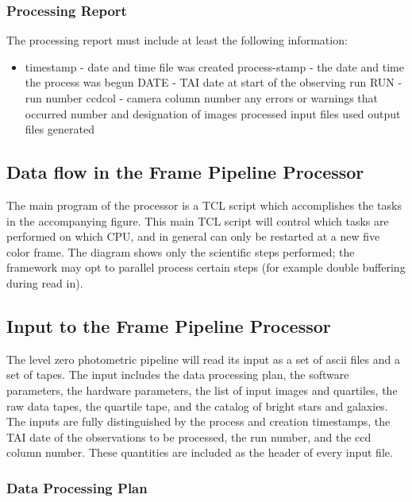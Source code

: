 \subsubsection{Processing Report}

The processing report must include at least the following information:
\begin{itemize}
\item timestamp - date and time file was created
\sitem process-stamp - the date and time the process was begun
\sitem DATE - TAI date at start of the observing run
\sitem RUN - run number
\sitem ccdcol - camera column number
\sitem any errors or warnings that occurred
\sitem number and designation of images processed
\sitem input files used
\sitem output files generated
\end{itemize}

\subsection{Data flow in the Frame Pipeline Processor}

	The main program of the processor is a TCL script which accomplishes
the tasks in the accompanying figure.  This main TCL script will control
which tasks are performed on which CPU, and in general can only be restarted 
at a new five color frame.  The diagram shows only the scientific steps
performed; the framework may opt to parallel process certain steps (for
example double buffering during read in).

\textwidth
\vspace{-1.5cm}

\subsection{Input to the Frame Pipeline Processor}

	The level zero photometric pipeline will read its input as a
set of ascii files and a set of tapes.  The input includes the data
processing plan, the software parameters, the hardware parameters,
the list of input images and quartiles, the raw data tapes, the quartile
tape, and the catalog of bright stars and galaxies.  The inputs are fully
distinguished by the process and creation timestamps, the TAI date of 
the observations to be processed, the run number, and the ccd column 
number.  These quantities are included as the header of every input file.

\subsubsection{Data Processing Plan}

